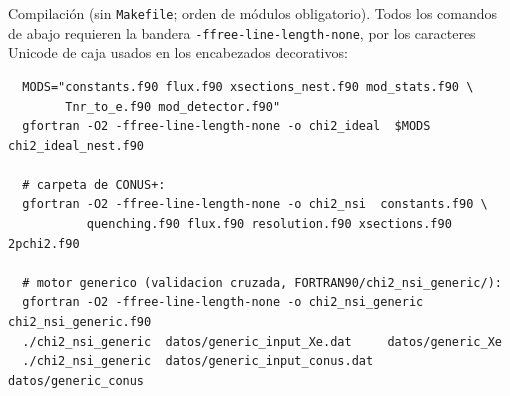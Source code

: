 \documentclass[11pt,a4paper]{article}
\newcommand{\code}[1]{\texttt{#1}}
\begin{document}
\noindent
Compilaci\'on (sin \code{Makefile}; orden de m\'odulos obligatorio). Todos los
comandos de abajo requieren la bandera \code{-ffree-line-length-none}, por los
caracteres Unicode de caja usados en los encabezados decorativos:
\begin{verbatim}
  MODS="constants.f90 flux.f90 xsections_nest.f90 mod_stats.f90 \
        Tnr_to_e.f90 mod_detector.f90"
  gfortran -O2 -ffree-line-length-none -o chi2_ideal  $MODS  chi2_ideal_nest.f90

  # carpeta de CONUS+:
  gfortran -O2 -ffree-line-length-none -o chi2_nsi  constants.f90 \
           quenching.f90 flux.f90 resolution.f90 xsections.f90 2pchi2.f90

  # motor generico (validacion cruzada, FORTRAN90/chi2_nsi_generic/):
  gfortran -O2 -ffree-line-length-none -o chi2_nsi_generic chi2_nsi_generic.f90
  ./chi2_nsi_generic  datos/generic_input_Xe.dat     datos/generic_Xe
  ./chi2_nsi_generic  datos/generic_input_conus.dat  datos/generic_conus
\end{verbatim}

\end{document}
